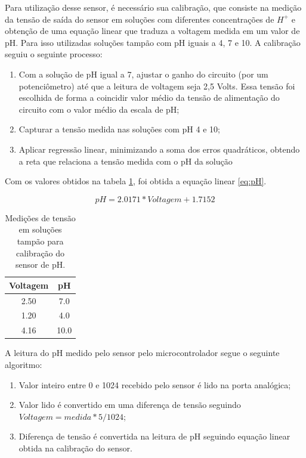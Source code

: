 Para utilização desse sensor, é necessário sua calibração, que consiste na medição da tensão de saída do sensor em soluções com diferentes concentrações de \(H^+\) e obtenção de uma equação linear que traduza a voltagem medida em um valor de pH. Para isso utilizadas soluções tampão com pH iguais a 4, 7 e 10. A calibração seguiu o seguinte processo:
\begin{enumerate}
    \item Com a solução de pH igual a 7, ajustar o ganho do circuito (por um potenciômetro) até que a leitura de voltagem seja 2,5 Volts. Essa tensão foi escolhida de forma a coincidir valor médio da tensão de alimentação do circuito com o valor médio da escala de pH;
    \item Capturar a tensão medida nas soluções com pH 4 e 10;
    \item Aplicar regressão linear, minimizando a soma dos erros quadráticos, obtendo a reta que relaciona a tensão medida com o pH da solução
\end{enumerate}


Com os valores obtidos na tabela \ref{tab:calibra_ph}, foi obtida a equação linear \ref{eq:pH}.

\begin{equation}
    pH = 2.0171 * Voltagem + 1.7152
    \label{eq:pH}
\end{equation}


\begin{table}[H]
    \begin{center}
        \begin{tabular}{ |c|c| } 
            \hline
            Voltagem & pH \\
            \hline
            2.50 & 7.0 \\ 
            \hline
            1.20 & 4.0 \\ 
            \hline
            4.16 & 10.0 \\ 
            \hline
        \end{tabular}
        \caption{\label{tab:calibra_ph}Medições de tensão em soluções tampão para calibração do sensor de pH.}
    \end{center}
\end{table}


A leitura do pH medido pelo sensor pelo microcontrolador segue o seguinte algoritmo:
\begin{enumerate}
    \item Valor inteiro entre 0 e 1024 recebido pelo sensor é lido na porta analógica;
    \item Valor lido é convertido em uma diferença de tensão seguindo \(Voltagem = medida * 5 / 1024\);
    \item Diferença de tensão é convertida na leitura de pH seguindo equação linear obtida na calibração do sensor.
\end{enumerate}


